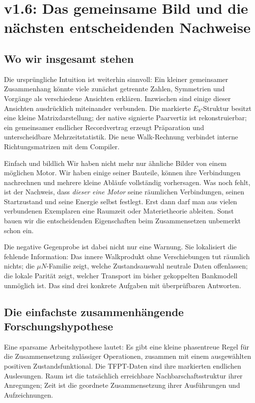 \chapter{v1.6: Das gemeinsame Bild und die nächsten entscheidenden Nachweise}
\label{ch:v16-program}
\section{Wo wir insgesamt stehen}
Die ursprüngliche Intuition ist weiterhin sinnvoll: Ein kleiner gemeinsamer Zusammenhang könnte viele zunächst getrennte Zahlen, Symmetrien und Vorgänge als verschiedene Ansichten erklären. Inzwischen sind einige dieser Ansichten ausdrücklich miteinander verbunden. Die markierte $E_8$-Struktur besitzt eine kleine Matrixdarstellung; der native signierte Paarvertiz ist rekonstruierbar; ein gemeinsamer endlicher Recordvertrag erzeugt Präparation und unterscheidbare Mehrzeitstatistik. Die neue Walk-Rechnung verbindet interne Richtungsmatrizen mit dem Compiler.

\begin{bild}{Einfach und bildlich}
Wir haben nicht mehr nur ähnliche Bilder von einem möglichen Motor. Wir haben einige seiner Bauteile, können ihre Verbindungen nachrechnen und mehrere kleine Abläufe vollständig vorhersagen. Was noch fehlt, ist der Nachweis, dass \emph{dieser eine Motor} seine räumlichen Verbindungen, seinen Startzustand und seine Energie selbst festlegt. Erst dann darf man aus vielen verbundenen Exemplaren eine Raumzeit oder Materietheorie ableiten. Sonst bauen wir die entscheidenden Eigenschaften beim Zusammensetzen unbemerkt schon ein.
\end{bild}

Die negative Gegenprobe ist dabei nicht nur eine Warnung. Sie lokalisiert die fehlende Information: Das innere Walkprodukt ohne Verschiebungen tut räumlich nichts; die $\mu N$-Familie zeigt, welche Zustandsauswahl neutrale Daten offenlassen; die lokale Parität zeigt, welcher Transport im bisher gekoppelten Bankmodell unmöglich ist. Das sind drei konkrete Aufgaben mit überprüfbaren Antworten.

\section{Die einfachste zusammenhängende Forschungshypothese}
Eine sparsame Arbeitshypothese lautet: Es gibt eine kleine phasentreue Regel für die Zusammensetzung zulässiger Operationen, zusammen mit einem ausgewählten positiven Zustandsfunktional. Die TFPT-Daten sind ihre markierten endlichen Auslesungen. Raum ist die tatsächlich erreichbare Nachbarschaftsstruktur ihrer Anregungen; Zeit ist die geordnete Zusammensetzung ihrer Ausführungen und Aufzeichnungen.

